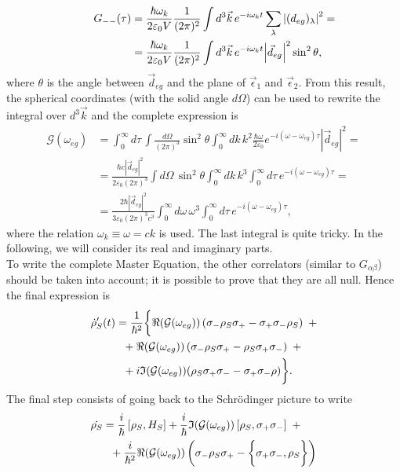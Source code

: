 \begin{align*}
    \qquad G_{--}(\tau) &= \frac{\hbar \omega_k}{2 \varepsilon_0 V} \frac{1}{(2\pi)^2} \int d^3 \vec{k} \, e^{-i\omega_k t} \sum_\lambda \abs{({d}_{eg})_\lambda}^2 = \\
    & = \frac{\hbar \omega_k}{2 \varepsilon_0 V} \frac{1}{(2\pi)^2} \int d^3 \vec{k} \, e^{-i\omega_k t}  \abs{\vec{d}_{eg}}^2 \sin^2{\theta}, 
\end{align*}
where $\theta$ is the angle between $\vec{d}_{eg}$ and the plane of $\vec{\epsilon}_1$ and $\vec{\epsilon}_2$. From this result, the spherical coordinates (with the solid angle $d \Omega$) can be used to rewrite the integral over $d^3 \vec{k}$ and the complete expression is 
\begin{align*}
    \mathcal{G}(\omega_{eg}) 
    &= \int_0^\infty d \tau \, \int \frac{d \Omega}{(2 \pi)^3} \sin^2 \theta \int_0^\infty dk \, k^2 \frac{\hbar \omega}{2 \varepsilon_0} e^{-i(\omega-\omega_{eg})\tau} |{\vec{d}_{eg}}|^2 = \\
    &= \frac{\hbar c |{\vec{d}_{eg}}|^2 }{2 \varepsilon_0 (2\pi)^3} \int d\Omega \, \sin^2 \theta \int_0^\infty dk \, k^3 \int_0^\infty d \tau \, e^{-i(\omega-\omega_{eg})\tau} = \\
    &= \frac{2 \hbar |{\vec{d}_{eg}}|^2  }{3 \varepsilon_0 (2 \pi)^3 c^3} \int_0^\infty d\omega \, \omega^3 \int_0^\infty d\tau \, e^{-i(\omega-\omega_{eg})\tau}, 
\end{align*}
where the relation $\omega_k \equiv \omega = c k$ is used. The last integral is quite tricky. In the following, we will consider its real and imaginary parts.\\
To write the complete Master Equation, the other correlators (similar to $G_{\alpha \beta}$) should be taken into account; it is possible to prove that they are all null. Hence the final expression is 
\begin{align*}
    \dot{\rho}'_S(t) &= \frac{1}{\hbar^2} \bigg\{ \real( \mathcal{G}(\omega_{eg})) \left( \sigma_-\rho_S \sigma_+ - \sigma_+ \sigma_- \rho_S \right) ~+ \\
    &~~+ \real( \mathcal{G}(\omega_{eg})) \left( \sigma_- \rho_S \sigma_+ - \rho_S \sigma_+ \sigma_- \right) ~+ \\
    &~~+i \mathfrak{I}(\mathcal{G}(\omega_{eg})) (\rho_S \sigma_+ \sigma_- - \sigma_+ \sigma_- \rho)\bigg\}. 
\end{align*}
The final step consists of going back to the Schr\"odinger picture to write 
\begin{equation}
    \begin{split}
        \dot{\rho_S} &= \frac{i}{\hbar} \left[ \rho_S,H_S \right] + \frac{i}{\hbar} \mathfrak{I} (\mathcal{G}(\omega_{eg})) \left[ \rho_S, \sigma_+ \sigma_-\right]~+ \\ 
        &~~+ \frac{i}{\hbar^2} \real(\mathcal{G}(\omega_{eg})) \left( \sigma_- \rho_S \sigma_+ - \bigg\{ \sigma_+ \sigma_-, \rho_S \bigg\}\right) 
    \end{split}
\end{equation}

